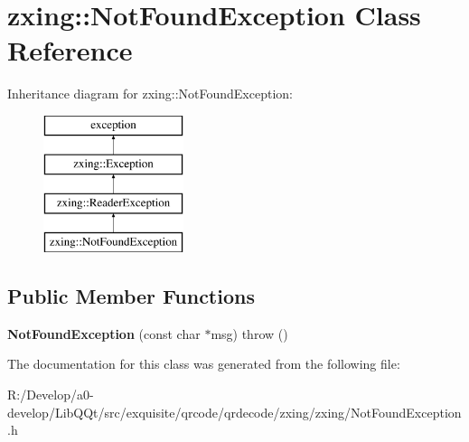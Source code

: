 \hypertarget{classzxing_1_1_not_found_exception}{}\section{zxing\+:\+:Not\+Found\+Exception Class Reference}
\label{classzxing_1_1_not_found_exception}
Inheritance diagram for zxing\+:\+:Not\+Found\+Exception\+:\begin{figure}[H]
\begin{center}
\leavevmode
\includegraphics[height=4.000000cm]{classzxing_1_1_not_found_exception}
\end{center}
\end{figure}
\subsection*{Public Member Functions}
\begin{DoxyCompactItemize}
\item 
\mbox{\label{classzxing_1_1_not_found_exception_a9d6481fbe02ccf1e4bd7018ca47c3d0f}} 
{\bfseries Not\+Found\+Exception} (const char $\ast$msg)  throw ()
\end{DoxyCompactItemize}


The documentation for this class was generated from the following file\+:\begin{DoxyCompactItemize}
\item 
R\+:/\+Develop/a0-\/develop/\+Lib\+Q\+Qt/src/exquisite/qrcode/qrdecode/zxing/zxing/Not\+Found\+Exception.\+h\end{DoxyCompactItemize}
